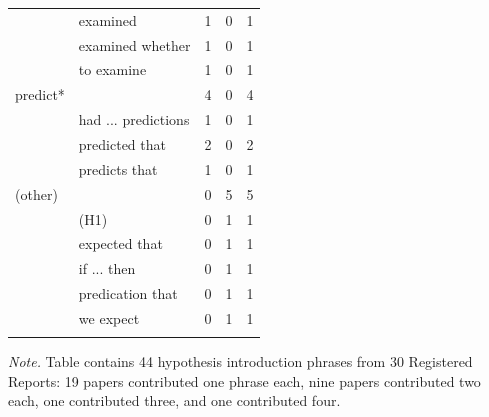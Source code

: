 \documentclass[british,,man,floatsintext]{apa6}
\begin{document}
\begin{table}[tbp]
\begin{center}
\begin{threeparttable}
{\begin{tabular}{llrrr}
 & examined & 1 & 0 & 1\\
 & examined whether & 1 & 0 & 1\\
 & to examine & 1 & 0 & 1\\ \midrule
predict* &  & 4 & 0 & 4\\
 & had ... predictions & 1 & 0 & 1\\
 & predicted that & 2 & 0 & 2\\
 & predicts that & 1 & 0 & 1\\ \midrule
(other) &  & 0 & 5 & 5\\
 & (H1) & 0 & 1 & 1\\
 & expected that & 0 & 1 & 1\\
 & if ... then & 0 & 1 & 1\\
 & predication that & 0 & 1 & 1\\
 & we expect & 0 & 1 & 1\\
\bottomrule
\addlinespace
\end{tabular}

}

\begin{tablenotes}[para]
\normalsize{\textit{Note.} Table contains 44 hypothesis introduction phrases from 30 Registered Reports: 19 papers contributed one phrase each, nine papers contributed two each, one contributed three, and one contributed four.}
\end{tablenotes}

\end{threeparttable}
\end{center}

\end{table}
\end{document}
